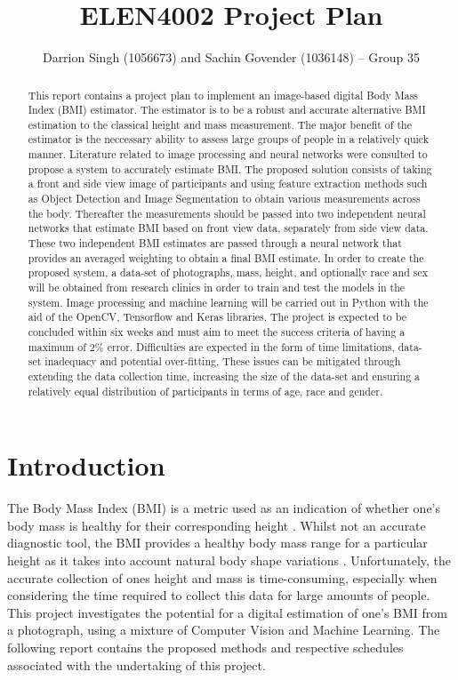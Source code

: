 \documentclass[conference]{IEEEtran}
\title{ELEN4002 Project Plan}
\author{Darrion Singh (1056673) and Sachin Govender (1036148) -- Group 35}
\begin{document}
\maketitle
\begin{abstract}
This report contains a project plan to implement an image-based digital Body Mass Index (BMI) estimator.
The estimator is to be a robust and accurate alternative BMI estimation to the classical height and mass measurement.
The major benefit of the estimator is the neccessary ability to assess large groups of people in a relatively quick manner.
Literature related to image processing and neural networks were consulted to propose a system to accurately estimate BMI.
The proposed solution consists of taking a front and side view image of participants and using feature extraction methods such as Object Detection and Image Segmentation to obtain various measurements across the body.
Thereafter the measurements should be passed into two independent neural networks that estimate BMI based on front view data, separately from side view data.
These two independent BMI estimates are passed through a neural network that provides an averaged weighting to obtain a final BMI estimate.
In order to create the proposed system, a data-set of photographs, mass, height, and optionally race and sex will be obtained from research clinics in order to train and test the models in the system.
Image processing and machine learning will be carried out in Python with the aid of the OpenCV, Tensorflow and Keras libraries.
The project is expected to be concluded within six weeks and must aim to meet the success criteria of having a maximum of 2\% error.
Difficulties are expected in the form of time limitations, data-set inadequacy and potential over-fitting.
These issues can be mitigated through extending the data collection time, increasing the size of the data-set and ensuring a relatively equal distribution of participants in terms of age, race and gender. 
\end{abstract}
\section{Introduction} \label{intro}
The Body Mass Index (BMI) is a metric used as an indication of whether one's body mass is healthy for their corresponding height \cite{nhsBMI}.
Whilst not an accurate diagnostic tool, the BMI provides a healthy body mass range for a particular height as it takes into account natural body shape variations \cite{nhsBMI}.
Unfortunately, the accurate collection of ones height and mass is time-consuming, especially when considering the time required to collect this data for large amounts of people.
This project investigates the potential for a digital estimation of one's BMI from a photograph, using a mixture of Computer Vision and Machine Learning.
The following report contains the proposed methods and respective schedules associated with the undertaking of this project.
\end{document}
